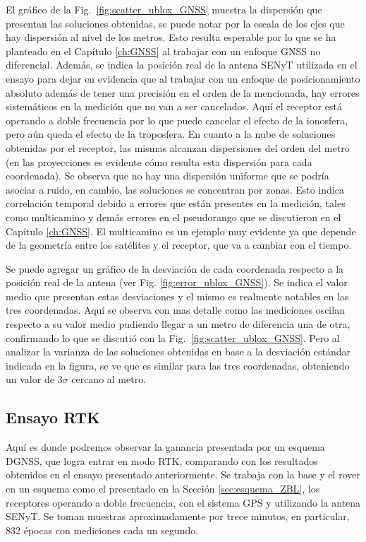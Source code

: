 \documentclass[a4paper,12pt,oneside,onecolumn,final,openright]{book}%
\begin{document}
	El gráfico de la Fig.~\ref{fig:scatter_ublox_GNSS} muestra la dispersión que presentan las soluciones obtenidas, se puede notar por la escala de los ejes que hay dispersión al nivel de los metros. Esto resulta esperable por lo que se ha planteado en el Capítulo \ref{ch:GNSS} al trabajar con un enfoque GNSS no diferencial. Además, se indica la posición real de la antena SENyT utilizada en el ensayo para dejar en evidencia que al trabajar con un enfoque de posicionamiento absoluto además de tener una precisión en el orden de la mencionada, hay errores sistemáticos en la medición que no van a ser cancelados. Aquí el receptor está operando a doble frecuencia por lo que puede cancelar el efecto de la ionosfera, pero aún queda el efecto de la troposfera. En cuanto a la nube de soluciones obtenidas por el receptor, las mismas alcanzan dispersiones del orden del metro (en las proyecciones es evidente cómo resulta esta dispersión para cada coordenada). Se observa que no hay una dispersión uniforme que se podría asociar a ruido, en cambio, las soluciones se concentran por zonas. Esto indica correlación temporal debido a errores que están presentes en la medición, tales como multicamino y demás errores en el pseudorango que se discutieron en el Capítulo \ref{ch:GNSS}. El multicamino es un ejemplo muy evidente ya que depende de la geometría entre los satélites y el receptor, que va a cambiar con el tiempo.
	
	 Se puede agregar un gráfico de la desviación de cada coordenada respecto a la posición real de la antena (ver Fig. \ref{fig:error_ublox_GNSS}). Se indica el valor medio que presentan estas desviaciones y el mismo es realmente notables en las tres coordenadas. Aquí se observa con mas detalle como las mediciones oscilan respecto a su valor medio pudiendo llegar a un metro de diferencia una de otra, confirmando lo que se discutió con la Fig.~\ref{fig:scatter_ublox_GNSS}. Pero al analizar la varianza de las soluciones obtenidas en base a la desviación estándar indicada en la figura, se ve que es similar para las tres coordenadas, obteniendo un valor de $3\sigma$ cercano al metro. 

\subsection{Ensayo RTK}\label{sec:RTK_ublox}
	Aquí es donde podremos observar la ganancia presentada por un esquema DGNSS, que logra entrar en modo RTK, comparando con los resultados obtenidos en el ensayo presentado anteriormente. Se trabaja con la base y el rover en un esquema como el presentado en la Sección \ref{sec:esquema_ZBL}, los receptores operando a doble frecuencia, con el sistema GPS y utilizando la antena SENyT. Se toman muestras aproximadamente por trece minutos, en particular, 832 épocas con mediciones cada un segundo. 
	
\end{document}
